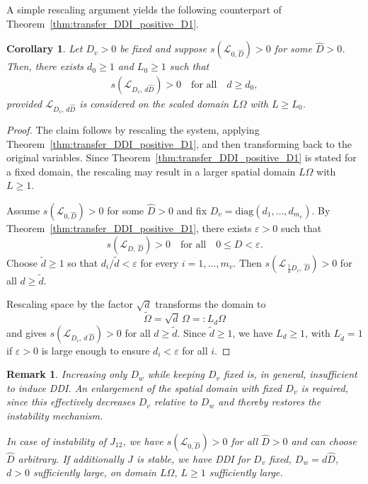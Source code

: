 \documentclass[12pt, a4paper]{amsart}
\numberwithin{equation}{section}
\newcommand{\Ds}{D_v}
\newcommand{\Df}{D_w}
\newcommand{\ms}{m_{v}}  %
\renewcommand{\L}{{\mathcal{L}}}
\newtheorem{corollary}[theorem]{\bf Corollary}
\newtheorem{remark}[theorem]{\bf Remark}
\begin{document}

A simple rescaling argument yields the
following counterpart of Theorem~\ref{thm:transfer_DDI_positive_D1}.


\begin{corollary}
\label{cor:transfer_stab_incr_domain}
Let $\Ds > 0$ be fixed and suppose $s(\L_{0,\hat{D}}) > 0$ for some $\hat{D} > 0$.
Then, there exists $d_0 \geqslant 1$ and $L_0 \geqslant 1$ such that
\begin{align}
s(\L_{\Ds,\,d\hat{D}}) > 0
\quad\text{for all}\quad d \geqslant d_0,
\end{align}
provided $\L_{\Ds,\,d\hat{D}}$ is considered on the scaled domain $L\Omega$ with $L \geqslant L_0$.
\end{corollary}

\begin{proof}
The claim follows by rescaling the system, applying Theorem~\ref{thm:transfer_DDI_positive_D1}, and then transforming back to the original variables.  
Since Theorem~\ref{thm:transfer_DDI_positive_D1} is stated for a fixed domain, the rescaling may result in a larger spatial domain $L\Omega$ with $L \geqslant 1$.

Assume $s(\L_{0,\hat{D}}) > 0$ for some $\hat{D} > 0$ and fix $\Ds = \mathrm{diag}(d_1,\dots,d_{\ms})$.  
By Theorem~\ref{thm:transfer_DDI_positive_D1}, there exists $\varepsilon > 0$ such that  
\[
s(\L_{D,\,\hat{D}}) > 0 \quad \text{for all} \quad 0 \le D < \varepsilon .
\]
Choose $\tilde{d} \ge 1$ so that $d_i / \tilde{d} < \varepsilon$ for every $i=1,\dots,\ms$.  
Then $s(\L_{\,\frac{1}{d}\Ds,\,\hat{D}}) > 0$ for all $d \ge \tilde{d}$.

Rescaling space by the factor $\sqrt{d}$ transforms the domain to
\[
\tilde{\Omega} = \sqrt{d}\,\Omega =: L_d \Omega
\]
and gives $s(\L_{\Ds,\,d\,\hat{D}}) > 0$ for all $d \ge \tilde{d}$.  
Since $\tilde{d} \ge 1$, we have $L_d \ge 1$, with $L_{\tilde{d}} = 1$ if $\varepsilon > 0$ is large enough to ensure $d_i < \varepsilon$ for all $i$.  
\end{proof}

\begin{remark}
\label{rem:increasing_domain_nec}
    Increasing only $\Df$ while keeping $\Ds$ fixed is, in general, insufficient to induce DDI. 
    An enlargement of the spatial domain with fixed $\Ds$ is required, since this effectively decreases $\Ds$ relative to $\Df$ and thereby restores the instability mechanism.

    In case of instability of $J_{12}$, we have $s(\L_{0,\hat{D}}) > 0$ for all $\hat{D} > 0$ and can choose $\hat{D}$ arbitrary.
    If additionally $J$ is stable, we have DDI for $\Ds$ fixed, $\Df = d\hat{D}$, $d>0$ sufficiently large, on domain $L\Omega$, $L\ge1$ sufficiently large.
\end{remark}
\end{document}
